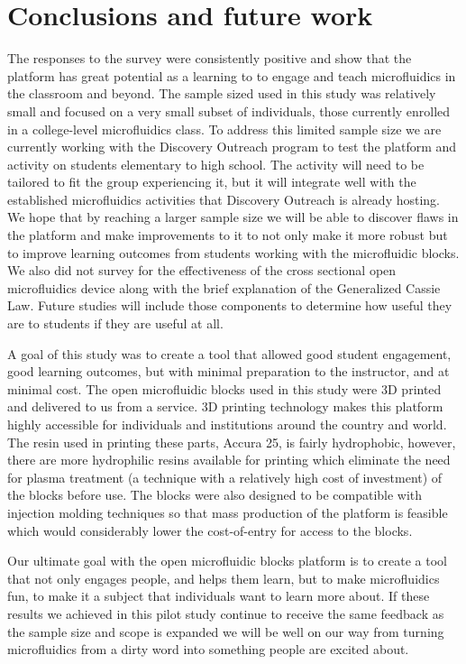 \section{Conclusions and future work}
The responses to the survey were consistently positive and show that the platform has great potential as a learning to to engage and teach microfluidics in the classroom and beyond. The sample sized used in this study was relatively small and focused on a very small subset of individuals, those currently enrolled in a college-level microfluidics class. To address this limited sample size we are currently working with the Discovery Outreach program to test the platform and activity on students elementary to high school. The activity will need to be tailored to fit the group experiencing it, but it will integrate well with the established microfluidics activities that Discovery Outreach is already hosting. We hope that by reaching a larger sample size we will be able to discover flaws in the platform and make improvements to it to not only make it more robust but to improve learning outcomes from students working with the microfluidic blocks. We also did not survey for the effectiveness of the cross sectional open microfluidics device along with the brief explanation of the Generalized Cassie Law. Future studies will include those components to determine how useful they are to students if they are useful at all.

A goal of this study was to create a tool that allowed good student engagement, good learning outcomes, but with minimal preparation to the instructor, and at minimal cost. The open microfluidic blocks used in this study were 3D printed and delivered to us from a service. 3D printing technology makes this platform highly accessible for individuals and institutions around the country and world. The resin used in printing these parts, Accura 25, is fairly hydrophobic, however, there are more hydrophilic resins available for printing which eliminate the need for plasma treatment (a technique with a relatively high cost of investment) of the blocks before use. The blocks were also designed to be compatible with injection molding techniques so that mass production of the platform is feasible which would considerably lower the cost-of-entry for access to the blocks. 

Our ultimate goal with the open microfluidic blocks platform is to create a tool that not only engages people, and helps them learn, but to make microfluidics fun, to make it a subject that individuals want to learn more about. If these results we achieved in this pilot study continue to receive the same feedback as the sample size and scope is expanded we will be well on our way from turning microfluidics from a dirty word into something people are excited about.

